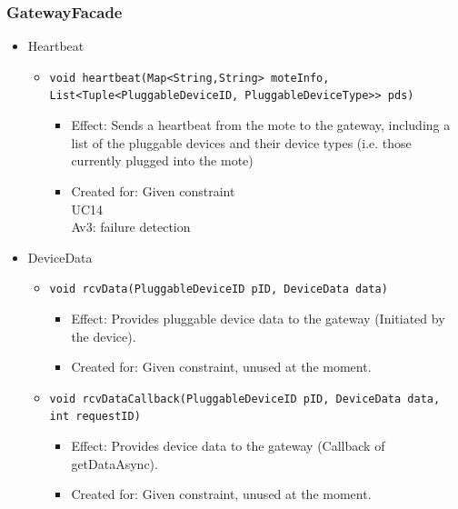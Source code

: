     \subsubsection{GatewayFacade}
        \begin{itemize}
            \item Heartbeat
            \begin{itemize}
                \item \texttt{void heartbeat(Map<String,String> moteInfo,
                                             List<Tuple<PluggableDeviceID, PluggableDeviceType>> pds)}
                \begin{itemize}
                    \item Effect: Sends a heartbeat from the mote to the gateway,
                          including a list of the pluggable devices and their device types
                          (i.e. those currently plugged into the mote)
                    \item Created for: Given constraint \\
                          UC14 \\
                          Av3: failure detection
                \end{itemize}
            \end{itemize}

            \item DeviceData
            \begin{itemize}
                \item \texttt{void rcvData(PluggableDeviceID pID, DeviceData data)}
                    \begin{itemize}
                        \item Effect: Provides pluggable device data to the gateway (Initiated by the device).
                        \item Created for: Given constraint, unused at the moment.
                    \end{itemize}
                \item \texttt{void rcvDataCallback(PluggableDeviceID pID, DeviceData data, int requestID)}
                    \begin{itemize}
                        \item Effect: Provides device data to the gateway (Callback of getDataAsync).
                        \item Created for: Given constraint, unused at the moment.
                    \end{itemize}
            \end{itemize}


\end{itemize}
